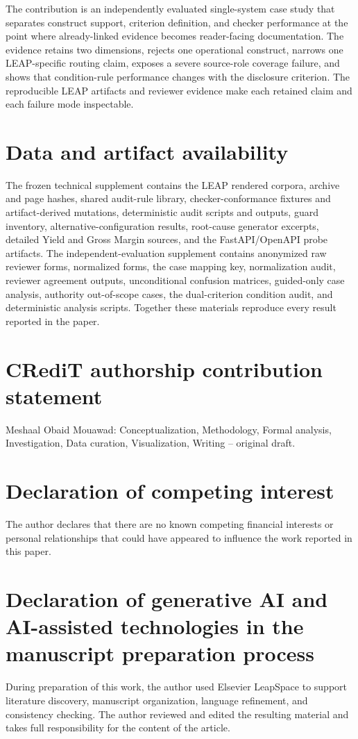 \documentclass[a4paper,fleqn]{cas-dc}
\begin{document}
The contribution is an independently evaluated single-system case study that separates construct support, criterion definition, and checker performance at the point where already-linked evidence becomes reader-facing documentation. The evidence retains two dimensions, rejects one operational construct, narrows one LEAP-specific routing claim, exposes a severe source-role coverage failure, and shows that condition-rule performance changes with the disclosure criterion. The reproducible LEAP artifacts and reviewer evidence make each retained claim and each failure mode inspectable.

\section*{Data and artifact availability}
The frozen technical supplement contains the LEAP rendered corpora, archive and page hashes, shared audit-rule library, checker-conformance fixtures and artifact-derived mutations, deterministic audit scripts and outputs, guard inventory, alternative-configuration results, root-cause generator excerpts, detailed Yield and Gross Margin sources, and the FastAPI/OpenAPI probe artifacts. The independent-evaluation supplement contains anonymized raw reviewer forms, normalized forms, the case mapping key, normalization audit, reviewer agreement outputs, unconditional confusion matrices, guided-only case analysis, authority out-of-scope cases, the dual-criterion condition audit, and deterministic analysis scripts. Together these materials reproduce every result reported in the paper.

\section*{CRediT authorship contribution statement}
Meshaal Obaid Mouawad: Conceptualization, Methodology, Formal analysis, Investigation, Data curation, Visualization, Writing -- original draft.

\section*{Declaration of competing interest}
The author declares that there are no known competing financial interests or personal relationships that could have appeared to influence the work reported in this paper.

\section*{Declaration of generative AI and AI-assisted technologies in the manuscript preparation process}
During preparation of this work, the author used Elsevier LeapSpace to support literature discovery, manuscript organization, language refinement, and consistency checking. The author reviewed and edited the resulting material and takes full responsibility for the content of the article.



\end{document}
